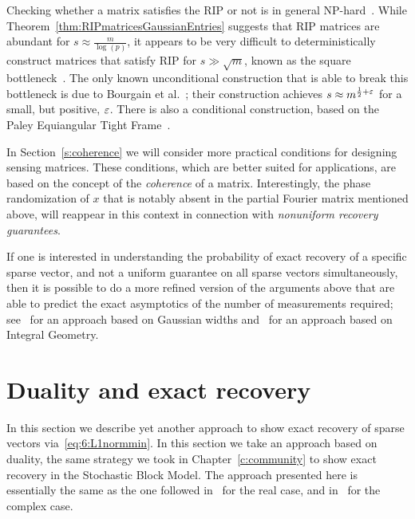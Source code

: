 Checking whether a matrix satisfies the RIP or not is in general NP-hard~\cite{Bandeira_etal_hardRIP,Tillmann_hardRIP}. While Theorem~\ref{thm:RIPmatricesGaussianEntries} suggests that RIP matrices are abundant for $s  \approx \frac{m}{\log\left( p \right)}$, it appears to be very difficult to deterministically construct matrices that satisfy RIP for $s\gg \sqrt{m}$, known as the square bottleneck~\cite{Tao_blog_deterministicRIP,Bandeira_RoadRIP,Bandeira_DerandomizingRIP,Bandeira_ConditionalPaley,JBourgain_etal_2011_RIP,Dustin_bookchapter_RIP}. The only known unconditional construction that is able to break this bottleneck is due to Bourgain et al.~\cite{JBourgain_etal_2011_RIP}; their construction achieves $s \approx m^{\frac12+\varepsilon}$ for a small, but positive, $\varepsilon$. There is also a conditional construction, based on the Paley Equiangular Tight Frame~\cite{Bandeira_RoadRIP,Bandeira_ConditionalPaley}.

In Section~\ref{s:coherence} we will consider more practical conditions for designing sensing matrices. These conditions, which are better suited for applications, are based on the concept of the  {\em coherence} of a matrix. Interestingly, the  phase randomization of $x$ that is notably absent in the partial Fourier matrix mentioned above, will reappear in this context in connection with {\em nonuniform recovery guarantees}.


\begin{remark}
If one is interested in understanding the probability of exact recovery of a specific sparse vector, and not a uniform guarantee on all sparse vectors simultaneously, then it is possible to do a more refined version of the arguments above that are able to predict the exact asymptotics of the number of measurements required; see~\cite{chandrasekaran2012convex} for an approach based on Gaussian widths and~\cite{amelunxen2014living} for an approach based on Integral Geometry.
\end{remark}














\section{Duality and exact recovery}

In this section we describe yet another approach to show exact recovery of sparse vectors via~\eqref{eq:6:L1normmin}. In this section we take an approach based on duality, the same strategy we took in Chapter~\ref{c:community} to show exact recovery in the Stochastic Block Model. The approach presented here is essentially the same as the one followed in~\cite{Fuchs_sparserepresentations} for the real case, and in~\cite{Tropp_shortcomplexlinearcombinations} for the complex case.

